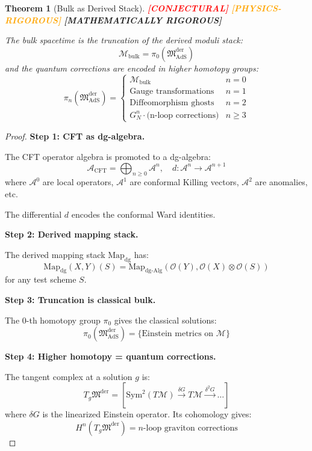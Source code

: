 \documentclass[12pt,a4paper]{article}
\newtheorem{theorem}{Theorem}[section]
\newcommand{\rigormark}[1]{%
  \ifcase#1
    \textcolor{red}{\textbf{[CONJECTURAL]}}%
  \or
    \textcolor{orange}{\textbf{[PHYSICS-RIGOROUS]}}%
  \or
    \textcolor{green!50!black}{\textbf{[MATHEMATICALLY RIGOROUS]}}%
  \fi
}
\begin{document}
\begin{theorem}[Bulk as Derived Stack]\label{thm:bulk-derived}
\rigormark{2}

The bulk spacetime is the truncation of the derived moduli stack:
\begin{equation}
\mathcal{M}_{\text{bulk}} = \pi_0(\mathfrak{M}_{\text{AdS}}^{\text{der}})
\end{equation}
and the quantum corrections are encoded in higher homotopy groups:
\begin{equation}
\pi_n(\mathfrak{M}_{\text{AdS}}^{\text{der}}) = \begin{cases}
\mathcal{M}_{\text{bulk}} & n = 0 \\
\text{Gauge transformations} & n = 1 \\
\text{Diffeomorphism ghosts} & n = 2 \\
G_N^n \cdot \text{(n-loop corrections)} & n \geq 3
\end{cases}
\end{equation}
\end{theorem}

\begin{proof}
\textbf{Step 1: CFT as dg-algebra.}

The CFT operator algebra is promoted to a dg-algebra:
\begin{equation}
\mathcal{A}_{\text{CFT}} = \bigoplus_{n \geq 0} \mathcal{A}^n, \quad d: \mathcal{A}^n \to \mathcal{A}^{n+1}
\end{equation}
where $\mathcal{A}^0$ are local operators, $\mathcal{A}^1$ are conformal Killing vectors, $\mathcal{A}^2$ are anomalies, etc.

The differential $d$ encodes the conformal Ward identities.

\textbf{Step 2: Derived mapping stack.}

The derived mapping stack $\text{Map}_{\text{dg}}$ has:
\begin{equation}
\text{Map}_{\text{dg}}(X, Y)(S) = \text{Map}_{\text{dg-Alg}}(\mathcal{O}(Y), \mathcal{O}(X) \otimes \mathcal{O}(S))
\end{equation}
for any test scheme $S$.

\textbf{Step 3: Truncation is classical bulk.}

The 0-th homotopy group $\pi_0$ gives the classical solutions:
\begin{equation}
\pi_0(\mathfrak{M}_{\text{AdS}}^{\text{der}}) = \{ \text{Einstein metrics on } \mathcal{M} \}
\end{equation}

\textbf{Step 4: Higher homotopy = quantum corrections.}

The tangent complex at a solution $g$ is:
\begin{equation}
T_g \mathfrak{M}^{\text{der}} = [\text{Sym}^2(T\mathcal{M}) \xrightarrow{\delta G} T\mathcal{M} \xrightarrow{\delta^2 G} \ldots]
\end{equation}
where $\delta G$ is the linearized Einstein operator. Its cohomology gives:
\begin{equation}
H^n(T_g \mathfrak{M}^{\text{der}}) = n\text{-loop graviton corrections}
\end{equation}
\end{proof}
\end{document}

